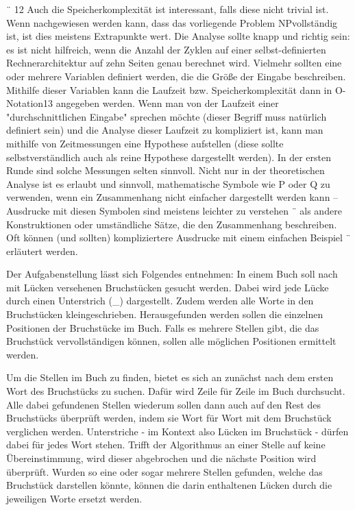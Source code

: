 \documentclass[a4paper,10pt,ngerman]{scrartcl}
\begin{document}
    ¨ 12 Auch die Speicherkomplexität ist interessant, falls diese nicht trivial ist.
    Wenn nachgewiesen werden kann, dass das vorliegende Problem NPvollständig ist, ist dies meistens Extrapunkte wert.
    Die Analyse sollte knapp und richtig
    sein: es ist nicht hilfreich, wenn die Anzahl der Zyklen auf einer selbst-definierten Rechnerarchitektur auf zehn Seiten genau berechnet wird.
    Vielmehr sollten eine oder mehrere
    Variablen definiert werden, die die Größe der Eingabe beschreiben.
    Mithilfe dieser Variablen kann die Laufzeit bzw.
    Speicherkomplexität dann in O-Notation13 angegeben werden.
    Wenn man von der Laufzeit einer  "durchschnittlichen Eingabe" sprechen möchte
    (dieser Begriff muss natürlich definiert sein) und die Analyse dieser Laufzeit zu kompliziert ist,
    kann man mithilfe von Zeitmessungen eine Hypothese aufstellen (diese sollte
    selbstverständlich auch als reine Hypothese dargestellt werden).
    In der ersten Runde sind solche Messungen selten sinnvoll.
    Nicht nur in der theoretischen Analyse ist es erlaubt und sinnvoll, mathematische
    Symbole wie P oder Q
    zu verwenden, wenn ein Zusammenhang nicht einfacher dargestellt werden kann – Ausdrucke mit diesen Symbolen sind meistens leichter zu verstehen ¨
    als andere Konstruktionen oder umständliche Sätze, die den Zusammenhang beschreiben.
    Oft können (und sollten) kompliziertere Ausdrucke mit einem einfachen Beispiel ¨
    erläutert werden.
    
    Der Aufgabenstellung lässt sich Folgendes entnehmen:
        In einem Buch soll nach mit Lücken versehenen Bruchstücken gesucht werden.
        Dabei wird jede Lücke durch einen Unterstrich (\_) dargestellt.
        Zudem werden alle Worte in den Bruchstücken kleingeschrieben.
        Herausgefunden werden sollen die einzelnen Positionen der Bruchstücke im Buch.
        Falls es mehrere Stellen gibt, die das Bruchstück vervollständigen können, sollen alle möglichen Positionen ermittelt werden.

    Um die Stellen im Buch zu finden, bietet es sich an zunächst nach dem ersten Wort des Bruchstücks zu suchen.
    Dafür wird Zeile für Zeile im Buch durchsucht.
    Alle dabei gefundenen Stellen wiederum sollen dann auch auf den Rest des Bruchstücks überprüft werden, indem sie Wort für Wort mit dem Bruchstück verglichen werden.
    Unterstriche - im Kontext also Lücken im Bruchstück - dürfen dabei für jedes Wort stehen.
    Trifft der Algorithmus an einer Stelle auf keine Übereinstimmung, wird dieser abgebrochen und die nächste Position wird überprüft.
    Wurden so eine oder sogar mehrere Stellen gefunden, welche das Bruchstück darstellen könnte, können die darin enthaltenen Lücken durch die jeweiligen Worte ersetzt werden.
\end{document}
